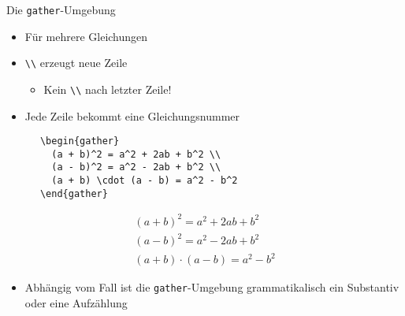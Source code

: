 \begin{frame}[fragile]{Die \texttt{gather}-Umgebung}
  \begin{itemize}
    \item Für mehrere Gleichungen
    \item \verb+\\+ erzeugt neue Zeile
      \begin{itemize}
        \item Kein \verb+\\+ nach letzter Zeile!
      \end{itemize}
    \item Jede Zeile bekommt eine Gleichungsnummer
  \end{itemize}
  \begin{CodeExample}{0.53}
    \begin{lstlisting}
      \begin{gather}
        (a + b)^2 = a^2 + 2ab + b^2 \\
        (a - b)^2 = a^2 - 2ab + b^2 \\
        (a + b) \cdot (a - b) = a^2 - b^2
      \end{gather}
    \end{lstlisting}
  \CodeResult
    \begin{gather}
      (a + b)^2 = a^2 + 2ab + b^2 \\
      (a - b)^2 = a^2 - 2ab + b^2 \\
      (a + b) \cdot (a - b) = a^2 - b^2
    \end{gather}
  \end{CodeExample}

  \vspace{1em}
  \begin{itemize}
    \item Abhängig vom Fall ist die \texttt{gather}-Umgebung grammatikalisch ein Substantiv oder eine Aufzählung
  \end{itemize}
\end{frame}

